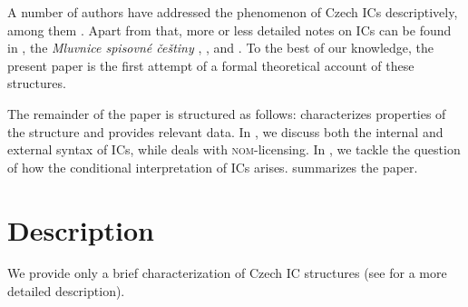 \documentclass[output=paper,colorlinks,citecolor=brown,
modfonts,newtxmath
]{langscibook}
\begin{document}
\noindent A number of authors have addressed the phenomenon of Czech ICs descriptively, among them \citet{Svoboda1959,Svoboda1960a,Svoboda1960b,Svoboda1962,Poldauf1959,Porak1959,Kiparsky1960,Kiparsky1967,Dunn1982,Karlik2007,Meyer2010,Milotova2011,Milotova2012}. Apart from that, more or less detailed notes on ICs can be found in \citet{Krizkova1972,Machackova1980}, the \textit{Mluvnice spisovné češtiny} \citep{Travnicek1951}, \citet{BauerGrepl1972}, and \citet{GreplKarlik1998}. To the best of our knowledge, the present paper is the first attempt of a formal theoretical account of these structures. 

The remainder of the paper is structured as follows:  characterizes properties of the structure and provides relevant data. In , we discuss both the internal and external syntax of ICs, while  deals with \textsc{nom}-licensing. In , we tackle the question of how the conditional interpretation of ICs arises.  summarizes the paper.


\section{Description}\label{sec:description}

We provide only a brief characterization of Czech IC structures (see \citealt{JunghannsPitsch2019} for a more detailed description).
\end{document}
